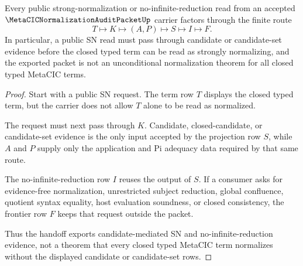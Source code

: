 \begin{theorem}
\label{thm:metacic-normalization-audit-packet-candidate-handoff}
Every public strong-normalization or no-infinite-reduction read from an accepted $\MetaCICNormalizationAuditPacketUp$ carrier factors through the finite route
$$
T \longmapsto K \longmapsto (A,P) \longmapsto S \longmapsto I \longmapsto F .
$$
In particular, a public SN read must pass through candidate or candidate-set evidence before the closed typed term can be read as strongly normalizing, and the exported packet is not an unconditional normalization theorem for all closed typed MetaCIC terms.
\end{theorem}
\begin{proof}
Start with a public SN request. The term row $T$ displays the closed typed term, but the carrier does not allow $T$ alone to be read as normalized.

The request must next pass through $K$. Candidate, closed-candidate, or candidate-set evidence is the only input accepted by the projection row $S$, while $A$ and $P$ supply only the application and Pi adequacy data required by that same route.

The no-infinite-reduction row $I$ reuses the output of $S$. If a consumer asks for evidence-free normalization, unrestricted subject reduction, global confluence, quotient syntax equality, host evaluation soundness, or closed consistency, the frontier row $F$ keeps that request outside the packet.

Thus the handoff exports candidate-mediated SN and no-infinite-reduction evidence, not a theorem that every closed typed MetaCIC term normalizes without the displayed candidate or candidate-set rows.
\end{proof}


